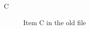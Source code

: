 \documentclass{article}
\begin{document}
\begin{description}
\item[C] Item C in the old file
\end{description}
\end{document}
